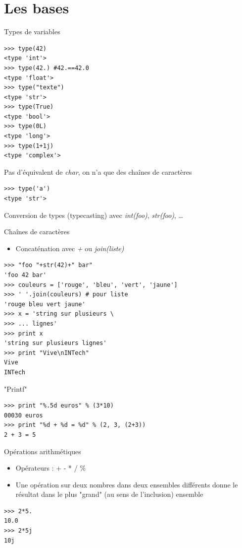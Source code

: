 \documentclass{beamer}
\begin{document}
\section{Les bases}
\begin{frame}[fragile]{Types de variables}
\begin{lstlisting}[multicols=2]
>>> type(42)
<type 'int'>
>>> type(42.) #42.==42.0
<type 'float'>
>>> type("texte")
<type 'str'>
>>> type(True)
<type 'bool'>
>>> type(0L)
<type 'long'>
>>> type(1+1j)
<type 'complex'>
\end{lstlisting}

Pas d'équivalent de \textit{char}, on n'a que des chaînes de caractères
\begin{lstlisting}
>>> type('a')
<type 'str'>
\end{lstlisting}

Conversion de types (typecasting) avec \textit{int(foo)}, \textit{str(foo)}, \dots
\end{frame}

\begin{frame}[fragile]{Chaînes de caractères}
\begin{itemize}
 \item Concaténation avec \textit{+} ou \textit{join(liste)}
\end{itemize}

\begin{lstlisting}
>>> "foo "+str(42)+" bar"
'foo 42 bar'
>>> couleurs = ['rouge', 'bleu', 'vert', 'jaune']
>>> ' '.join(couleurs) # pour liste
'rouge bleu vert jaune'
>>> x = 'string sur plusieurs \
>>> ... lignes'
>>> print x
'string sur plusieurs lignes'
>>> print "Vive\nINTech"
Vive
INTech
\end{lstlisting}
\end{frame}

\begin{frame}[fragile]{"Printf"}
\begin{lstlisting}
>>> print "%.5d euros" % (3*10)
00030 euros
>>> print "%d + %d = %d" % (2, 3, (2+3))
2 + 3 = 5
\end{lstlisting}

\end{frame}

\begin{frame}[fragile]{Opérations arithmétiques}
\begin{itemize}
 \item Opérateurs : + - * / \%
 \item Une opération sur deux nombres dans deux ensembles différents donne le résultat dans le plus "grand" (au sens de l'inclusion) ensemble
\end{itemize}

\begin{lstlisting}
>>> 2*5.
10.0
>>> 2*5j
10j
\end{lstlisting}

\end{frame}
\end{document}
